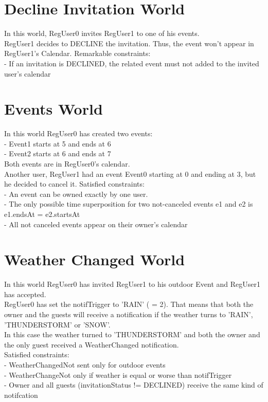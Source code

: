 \documentclass[12pt]{book}
\begin{document}
\section{Decline Invitation World}
In this world, RegUser0 invites RegUser1 to one of his events.\\
RegUser1 decides to DECLINE the invitation. Thus, the event won't appear in RegUser1's Calendar.
Remarkable constraints:\\
- If an invitation is DECLINED, the related event must not added to the invited user's calendar

\section{Events World}
In this world RegUser0 has created two events:\\
- Event1 starts at 5 and ends at 6\\
- Event2 starts at 6 and ends at 7\\
Both events are in RegUser0's calendar.\\
Another user, RegUser1 had an event Event0 starting at 0 and ending at 3, but he decided to cancel it.
Satisfied constraints:\\
- An event can be owned exactly by one user.\\
- The only possible time superposition for two not-canceled events e1 and e2 is e1.endsAt = e2.startsAt\\
- All not canceled events appear on their owner's calendar \\

\section{Weather Changed World}
In this world RegUser0 has invited RegUser1 to his outdoor Event and RegUser1 has accepted.\\
RegUser0 has set the notifTrigger  to 'RAIN' ( = 2). That means that both the owner and the guests
will receive a notification if the weather turns to 'RAIN', 'THUNDERSTORM' or 'SNOW'.\\
In this case the weather turned to 'THUNDERSTORM' and both the owner and the only guest 
received a WeatherChanged notification.\\
Satisfied constraints:\\
- WeatherChangedNot sent only for outdoor events\\
- WeatherChangeNot only if weather is equal or worse than notifTrigger\\
- Owner and all guests (invitationStatus != DECLINED) receive the same kind of notifcation\\
\end{document}
